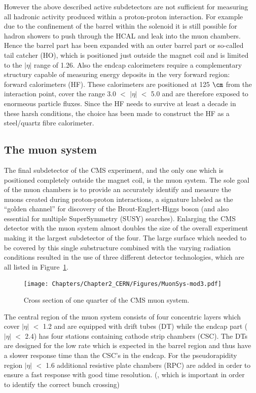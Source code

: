 However the above described active subdetectors are not sufficient for measuring all hadronic activity produced within a proton-proton interaction. For example due to the confinement of the barrel  within the solenoid it is still possible for hadron showers to push through the HCAL and leak into the muon chambers. Hence the barrel part has been expanded with an outer barrel part or so-called tail catcher (HO), which is positioned just outside the magnet coil and is limited to the $\vert \eta \vert$ range of 1.26. Also the endcap calorimeters require a complementary structury capable of measuring energy deposits in the very forward region: forward calorimeters (HF). These calorimeters are positioned at 125 $\cm$ from the interaction point, cover the range 3.0 $<$ $\vert \eta \vert$ $<$ 5.0 and are therefore exposed to enormeous particle fluxes. Since the HF needs to survive at least a decade in these harsh conditions, the choice has been made to construct the HF as a steel/quartz fibre calorimeter.

\subsection{The muon system}\label{sec::MuonChamber}

The final subdetector of the CMS experiment, and the only one which is positioned completely outside the magnet coil, is the muon system. The sole goal of the muon chambers is to provide an accurately identify and measure the muons created during proton-proton interactions, a signature labeled as the ``golden channel'' for discovery of the Brout-Englert-Higgs boson (and also essential for multiple SuperSymmetry (SUSY) searches). 
Enlarging the CMS detector with the muon system almost doubles the size of the overall experiment making it the largest subdetector of the four. 
The large surface which needed to be covered by this single substructure combined with the varying radiation conditions resulted in the use of three different detector technologies, which are all listed in Figure~\ref{fig::MuonAndCMS}.
\begin{figure}[h!t]
 \centering
 \texttt{[image: Chapters/Chapter2\_CERN/Figures/MuonSys-mod3.pdf]}
 \caption{Cross section of one quarter of the CMS muon system.} \label{fig::MuonAndCMS}
\end{figure}

The central region of the muon system consists of four concentric layers which cover $\vert \eta \vert$ $<$ 1.2 and are equipped with drift tubes (DT) while the endcap part ($\vert \eta \vert$ $<$ 2.4) has four stations containing cathode strip chambers (CSC). The DTs are designed for the low rate which is expected in the barrel region and thus have a slower response time than the CSC's in the endcap. For the pseudorapidity region $\vert \eta \vert$ $<$ 1.6 additional resistive plate chambers (RPC) are added in order to ensure a fast response with good time resolution. (, which is important in order to identify the correct bunch crossing)

